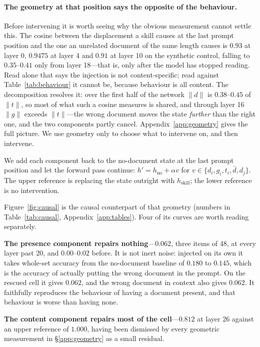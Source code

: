 \documentclass{article}
\newcommand{\dvec}{\ensuremath{d}}
\newcommand{\gvec}{\ensuremath{g}}
\newcommand{\tvec}{\ensuremath{t}}
\begin{document}
\paragraph{The geometry at that position says the opposite of the behaviour.}
Before intervening it is worth seeing why the obvious measurement cannot settle
this. The cosine between the displacement a skill causes at the last prompt
position and the one an unrelated document of the same length causes is $0.93$ at
layer 0, $0.9475$ at layer 4 and $0.91$ at layer 10 on the synthetic control,
falling to $0.35$--$0.41$ only from layer 18---that is, only after the model has
stopped reading. Read alone that says the injection is not content-specific;
read against Table~\ref{tab:behaviour} it cannot be, because behaviour is all
content. The decomposition resolves it: over the first half of the network
$\|\dvec\|$ is $0.38$--$0.45$ of $\|\tvec\|$, so most of what such a cosine
measures is shared, and through layer 16 $\|\gvec\|$ exceeds $\|\tvec\|$---the
wrong document moves the state \emph{further} than the right one, and the two
components partly cancel. Appendix~\ref{app:geometry} gives the full picture. We
use geometry only to choose what to intervene on, and then intervene.


We add each component back to the no-document state at the last prompt position
and let the forward pass continue: $h' = h_{\text{no}} + \alpha v$ for
$v \in \{\dvec_i, \gvec_i, \tvec_i, \bar{\dvec}, \dvec_j\}$. The upper reference
is replacing the state outright with $h_{\text{skill}}$; the lower reference is
no intervention.




Figure~\ref{fig:causal} is the causal counterpart of that geometry (numbers in
Table~\ref{tab:causal}, Appendix~\ref{app:tables}). Four of its curves are worth
reading separately.

\textbf{The presence component repairs nothing}---$0.062$, three items of 48, at
every layer past 20, and $0.00$--$0.02$ before. It is not inert noise: injected
on its own it takes whole-set accuracy from the no-document baseline of $0.180$
to $0.145$, which is the accuracy of actually putting the wrong document in the
prompt. On the rescued cell it gives $0.062$, and the wrong document in context
also gives $0.062$. It faithfully reproduces the behaviour of having a document
present, and that behaviour is worse than having none.

\textbf{The content component repairs most of the cell}---$0.812$ at layer 26
against an upper reference of $1.000$, having been dismissed by every geometric
measurement in \S\ref{app:geometry} as a small residual.
\end{document}
